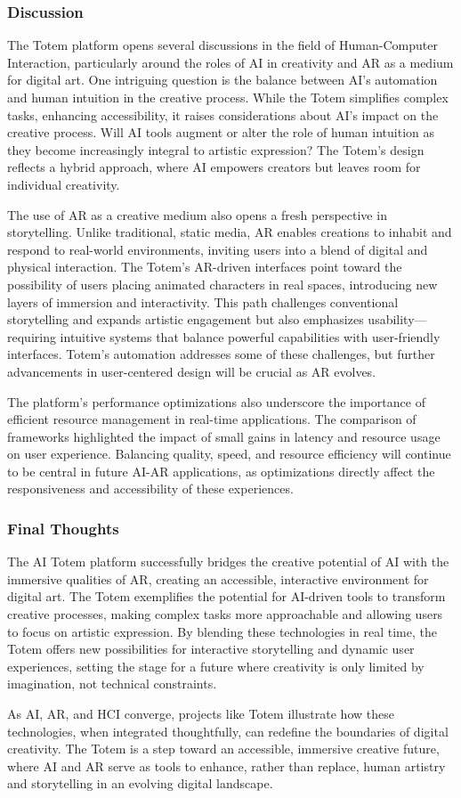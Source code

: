 \subsubsection{Discussion}
The Totem platform opens several discussions in the field of Human-Computer Interaction, particularly around the roles of AI in creativity and AR as a medium for digital art.
One intriguing question is the balance between AI’s automation and human intuition in the creative process.
While the Totem simplifies complex tasks, enhancing accessibility, it raises considerations about AI’s impact on the creative process.
Will AI tools augment or alter the role of human intuition as they become increasingly integral to artistic expression?
The Totem’s design reflects a hybrid approach, where AI empowers creators but leaves room for individual creativity.

The use of AR as a creative medium also opens a fresh perspective in storytelling.
Unlike traditional, static media, AR enables creations to inhabit and respond to real-world environments, inviting users into a blend of digital and physical interaction.
The Totem’s AR-driven interfaces point toward the possibility of users placing animated characters in real spaces, introducing new layers of immersion and interactivity.
This path challenges conventional storytelling and expands artistic engagement but also emphasizes usability—requiring intuitive systems that balance powerful capabilities with user-friendly interfaces.
Totem’s automation addresses some of these challenges, but further advancements in user-centered design will be crucial as AR evolves.

The platform’s performance optimizations also underscore the importance of efficient resource management in real-time applications.
The comparison of frameworks highlighted the impact of small gains in latency and resource usage on user experience.
Balancing quality, speed, and resource efficiency will continue to be central in future AI-AR applications, as optimizations directly affect the responsiveness and accessibility of these experiences.

\subsubsection{Final Thoughts}
The AI Totem platform successfully bridges the creative potential of AI with the immersive qualities of AR, creating an accessible, interactive environment for digital art.
The Totem exemplifies the potential for AI-driven tools to transform creative processes, making complex tasks more approachable and allowing users to focus on artistic expression.
By blending these technologies in real time, the Totem offers new possibilities for interactive storytelling and dynamic user experiences, setting the stage for a future where creativity is only limited by imagination, not technical constraints.

As AI, AR, and HCI converge, projects like Totem illustrate how these technologies, when integrated thoughtfully, can redefine the boundaries of digital creativity.
The Totem is a step toward an accessible, immersive creative future, where AI and AR serve as tools to enhance, rather than replace, human artistry and storytelling in an evolving digital landscape.